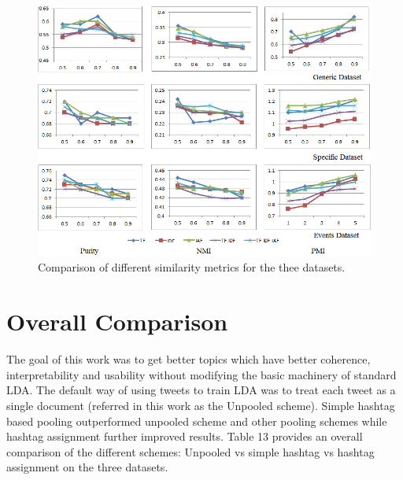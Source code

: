 \documentclass[10pt,a5paper,twoside]{article}
\begin{document}

\begin{figure}[t!]
\begin{center}
\includegraphics[width=.85\textwidth]{Metrics.png}
\end{center}
\caption{\footnotesize Comparison of different similarity metrics for the thee datasets.
} \label{fig:xadd}
\end{figure}




\section{Overall Comparison}
The goal of this work was to get better topics which have better coherence, interpretability and usability without modifying the basic machinery of standard LDA. The default way of using tweets to train LDA was to treat each tweet as a single document (referred in this work as the Unpooled scheme). Simple hashtag based pooling outperformed unpooled scheme and other pooling schemes while hashtag assignment further improved results. Table 13 provides an overall comparison of the different schemes: Unpooled vs simple hashtag vs hashtag assignment on the three datasets.
\\
\end{document}
